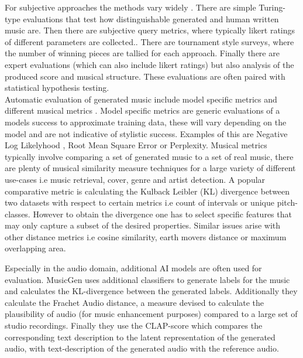 For subjective approaches the methods vary widely \cite{Xiong_Wang_ai_eval_methods_2023}. There are simple Turing-type evaluations that test how distinguishable generated and human written music are. Then there are subjective query metrics, where typically likert ratings of different parameters are collected.\cite{Min_Jiang_Xia_Zhao_polyffusion_2023}.
There are tournament style surveys, where the number of winning pieces are tallied for each approach.\cite{Huang_Vaswani_Uszkoreit_Shazeer_Simon_Hawthorne_Dai_Hoffman_Dinculescu_Eck_2018}\cite{Rütte_figaro_2023} Finally there are expert evaluations (which can also include likert ratings) but also analysis of the produced score and musical structure. \cite{Sturm_Ben-Tal_2016} These evaluations are often paired with statistical hypothesis testing. \cite{Rütte_figaro_2023}\\

Automatic evaluation of generated music include model specific metrics and different musical metrics \cite{Xiong_Wang_ai_eval_methods_2023}. Model specific metrics are generic evaluations of a models success to approximate training data, these will vary depending on the model and are not indicative of stylistic success. Examples of this are Negative Log Likelyhood \cite{Huang_Vaswani_Uszkoreit_Shazeer_Simon_Hawthorne_Dai_Hoffman_Dinculescu_Eck_2018}, Root Mean Square Error \cite{Rütte_figaro_2023} or Perplexity\cite{Rütte_figaro_2023}. Musical metrics typically involve comparing a set of generated music to a set of real music, there are plenty of musical similarity measure techniques\cite{Gurjar_Moon_similarity_2018} for a large variety of different use-cases i.e music retrieval, cover, genre and artist detection. A popular comparative metric is calculating the Kulback Leibler (KL) divergence between two datasets with respect to certain metrics i.e count of intervals or unique pitch-classes. However to obtain the divergence one has to select specific features that may only capture a subset of the desired properties. Similar issues arise with other distance metrics i.e cosine similarity, earth movers distance or maximum overlapping area. 

Especially in the audio domain, additional AI models are often used for evaluation. MusicGen \cite{copet2023simple} uses additional classifiers to generate labels for the music and calculates the KL-divergence between the generated labels. Additionally they calculate the Frachet Audio distance, a measure devised to calculate the plausibility of audio (for music enhancement purposes) compared to a large set of studio recordings\cite{Kilgour_Frachet_2019}. Finally they use the CLAP-score which compares the corresponding text description to the latent representation of the generated audio, with text-description of the generated audio with the reference audio. \cite{Elizalde_Deshmukh_Ismail_Wang_2023}

